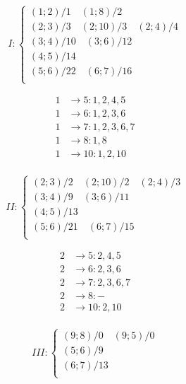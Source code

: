 \documentclass[a4paper,12pt]{article}
\begin{document}
\newpage

\begin{equation*}
I: 
\begin{cases}
(1;2)/1 \quad (1;8)/2 \\
(2;3)/3 \quad (2;10)/3 \quad (2;4)/4 \\
(3;4)/10 \quad (3;6)/12 \\
(4;5)/14 \\
(5;6)/22 \quad (6;7)/16 \\
\end{cases}
\end{equation*}

\[
\begin{aligned}
1 &\rightarrow 5: 1, 2, 4, 5 \\
1 &\rightarrow 6: 1, 2, 3, 6 \\
1 &\rightarrow 7: 1, 2, 3, 6, 7 \\
1 &\rightarrow 8: 1, 8 \\
1 &\rightarrow 10: 1, 2, 10 \\
\end{aligned}
\]


\begin{equation*}
II: 
\begin{cases}
(2;3)/2 \quad (2;10)/2 \quad (2;4)/3 \\
(3;4)/9 \quad (3;6)/11 \\
(4;5)/13 \\
(5;6)/21 \quad (6;7)/15 \\
\end{cases}
\end{equation*}

\[
\begin{aligned}
2 &\rightarrow 5: 2, 4, 5 \\
2 &\rightarrow 6: 2, 3, 6 \\
2 &\rightarrow 7: 2, 3, 6, 7 \\
2 &\rightarrow 8: - \\
2 &\rightarrow 10: 2, 10 \\
\end{aligned}
\]

\begin{equation*}
III: 
\begin{cases}
(9;8)/0 \quad (9;5)/0 \\
(5;6)/9 \\
(6;7)/13 \\
\end{cases}
\end{equation*}
\end{document}
